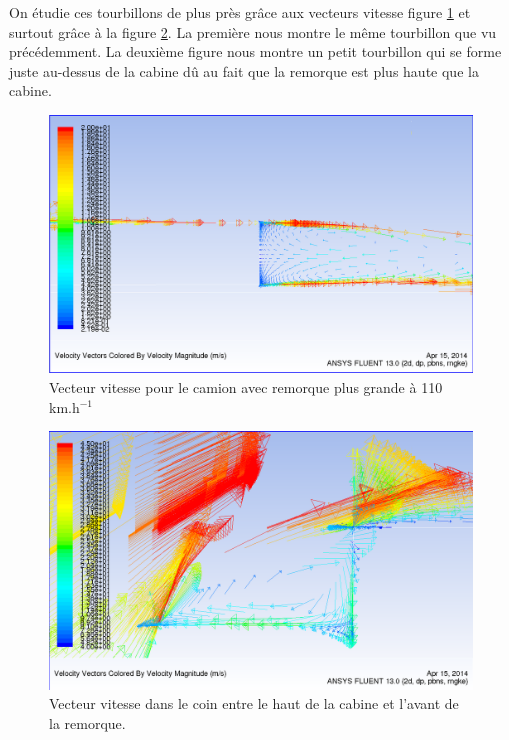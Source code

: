 On étudie ces tourbillons de plus près grâce aux vecteurs vitesse figure \ref{figRem2Vit110} et surtout grâce à la figure \ref{figRem2Vit110-coin}. La première nous montre le même tourbillon que vu précédemment. La deuxième figure nous montre un petit tourbillon qui se forme juste au-dessus de la cabine dû au fait que la remorque est plus haute que la cabine.\\
\begin{figure}[!h]
\centering
\includegraphics[scale=0.4]{resultsCx/Remorque2-110_VelocityVectors.png}
\caption{Vecteur vitesse pour le camion avec remorque plus grande à 110 km.h$^{-1}$}
\label{figRem2Vit110}
\end{figure}
\begin{figure}[!h]
\centering
\includegraphics[scale=0.4]{resultsCx/remorque2-hautCabineAbsorption.png}
\caption{Vecteur vitesse dans le coin entre le haut de la cabine et l'avant de la remorque.}
\label{figRem2Vit110-coin}
\end{figure}
\clearpage


